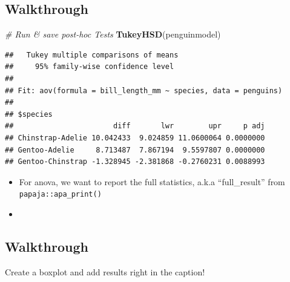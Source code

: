 \documentclass[
]{book}
\newenvironment{Shaded}{\begin{snugshade}}{\end{snugshade}}
\newcommand{\CommentTok}[1]{\textcolor[rgb]{0.56,0.35,0.01}{\textit{#1}}}
\newcommand{\FunctionTok}[1]{\textcolor[rgb]{0.13,0.29,0.53}{\textbf{#1}}}
\newcommand{\NormalTok}[1]{#1}
\newcommand{\OtherTok}[1]{\textcolor[rgb]{0.56,0.35,0.01}{#1}}
\newcommand{\SpecialCharTok}[1]{\textcolor[rgb]{0.81,0.36,0.00}{\textbf{#1}}}
\begin{document}
\subsection{Walkthrough}\label{walkthrough-1}

\begin{Shaded}
\begin{Highlighting}[]
\CommentTok{\# Run \& save post{-}hoc Tests}
\FunctionTok{TukeyHSD}\NormalTok{(penguinmodel)}
\end{Highlighting}
\end{Shaded}

\begin{verbatim}
##   Tukey multiple comparisons of means
##     95% family-wise confidence level
## 
## Fit: aov(formula = bill_length_mm ~ species, data = penguins)
## 
## $species
##                       diff       lwr        upr     p adj
## Chinstrap-Adelie 10.042433  9.024859 11.0600064 0.0000000
## Gentoo-Adelie     8.713487  7.867194  9.5597807 0.0000000
## Gentoo-Chinstrap -1.328945 -2.381868 -0.2760231 0.0088993
\end{verbatim}

\begin{itemize}
\item
  For anova, we want to report the full statistics, a.k.a ``full\_result'' from \texttt{papaja::apa\_print()}
\item
\begin{Shaded}
\end{Shaded}
\end{itemize}

\subsection{Walkthrough}\label{walkthrough-2}

Create a boxplot and add results right in the caption!
\end{document}
